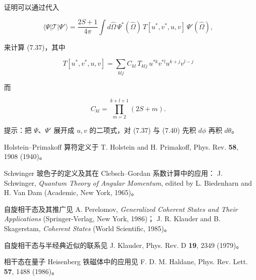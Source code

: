 \begin{exercises}
证明可以通过代入

\begin{equation*}
\langle \Psi | \mathcal {T} | \Psi ' \rangle = \frac {2 S + 1}{4 \pi} \int d \hat {\Omega} \, \Psi ^ {*} ( \hat {\Omega} ) \, T [ u ^ {*}, v ^ {*}, u, v ] \, \Psi ' ( \hat {\Omega} ) ,
\tag{7.38}
\end{equation*}

来计算 (7.37)，其中

\begin{equation*}
T \left[ u ^ {*}, v ^ {*}, u, v \right] = \sum_ {klj} C _ {kl} \, T _ {klj} \, u ^ {*k} v ^ {*l} u ^ {k + j} v ^ {l - j}
\tag{7.39}
\end{equation*}

而

\begin{equation*}
C _ {kl} = \prod_ {m = 2} ^ {k + l + 1} ( 2 S + m ).
\tag{7.40}
\end{equation*}

提示：把 $\Psi$、$\Psi'$ 展开成 $u, v$ 的二项式，对 (7.37) 与 (7.40) 先积 $d\phi$ 再积 $d\theta$。

\end{exercises}

\begin{chapbib}
\item Holstein--Primakoff 算符定义于
  T. Holstein and H. Primakoff, Phys. Rev. \textbf{58}, 1908 (1940)。
\item Schwinger 玻色子的定义及其在 Clebsch--Gordan 系数计算中的应用：
  J. Schwinger, \textit{Quantum Theory of Angular Momentum}, edited by L. Biedenharn and H. Van Dam (Academic, New York, 1965)。
\item 自旋相干态及其推广见
  A. Perelomov, \textit{Generalized Coherent States and Their Applications} (Springer-Verlag, New York, 1986)；
  J. R. Klauder and B. Skagerstam, \textit{Coherent States} (World Scientific, 1985)。
\item 自旋相干态与半经典近似的联系见
  J. Klauder, Phys. Rev. D \textbf{19}, 2349 (1979)。
\item 相干态在量子 Heisenberg 铁磁体中的应用见
  F. D. M. Haldane, Phys. Rev. Lett. \textbf{57}, 1488 (1986)。
\end{chapbib}
